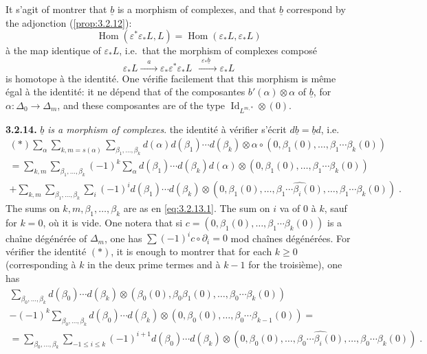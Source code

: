 \documentclass[12pt,a4paper]{article}
\theoremstyle{plain}
\theoremstyle{definition}
\DeclareMathOperator{\Hom}{Hom}
\DeclareMathOperator{\Id}{Id}
\providecommand{\Hom}{\operatorname{Hom}}
\begin{document}
It s'agit of montrer that $\underline{b}$ is a morphism of complexes, and that $\underline{b}$ correspond by the adjonction (\ref{prop:3.2.12}):
\[
\Hom(\varepsilon^{*}\varepsilon_{*}L, L) = \Hom(\varepsilon_{*}L, \varepsilon_{*}L)
\]
\`{a} the map identique of $\varepsilon_{*}L$, i.e.\ that the morphism of complexes compos\'{e}
\[
\varepsilon_{*}L \xrightarrow{\quad a\quad} \varepsilon_{*}\varepsilon^{*}\varepsilon_{*}L \xrightarrow{\quad \varepsilon_{*}\underline{b}\quad} \varepsilon_{*}L
\]
is homotope \`{a} the identit\'{e}. One v\'{e}rifie facilement that this morphism is m\^{e}me \'{e}gal \`{a} the identit\'{e}: it ne d\'{e}pend that of the composantes $b'(\alpha) \otimes \alpha$ of $\underline{b}$, for $\alpha: \Delta_{0} \to \Delta_{m}$, and these composantes are of the type $\Id_{L^{m,*}} \otimes (0)$.

\noindent\textbf{3.2.14.} $\underline{b}$ \emph{is a morphism of complexes}. the identit\'{e} \`{a} v\'{e}rifier s'\'{e}crit $d\underline{b} = \underline{b}d$, i.e.
\begin{multline*}
(*) \sum_{\alpha} \sum_{k,m=s(\alpha)} \sum_{\beta_{1},\ldots,\beta_{k}} d(\alpha)d(\beta_{1})\cdots d(\beta_{k}) \otimes \alpha \circ (0,\beta_{1}(0),\ldots,\beta_{1}\cdots\beta_{k}(0)) \\
= \sum_{k,m} \sum_{\beta_{1},\ldots,\beta_{k}} (-1)^{k} \sum_{\alpha} d(\beta_{1})\cdots d(\beta_{k})d(\alpha) \otimes (0,\beta_{1}(0),\ldots,\beta_{1}\cdots\beta_{k}(0)) \\
+ \sum_{k,m} \sum_{\beta_{1},\ldots,\beta_{k}} \sum_{i} (-1)^{i} d(\beta_{1})\cdots d(\beta_{k}) \otimes (0,\beta_{1}(0),\ldots,\widehat{\beta_{1}\cdots\beta_{i}(0)},\ldots,\beta_{1}\cdots\beta_{k}(0))\;.
\end{multline*}
The sums on $k,m,\beta_{1},\ldots,\beta_{k}$ are as en \eqref{eq:3.2.13.1}. The sum on $i$ va of $0$ \`{a} $k$, sauf for $k=0$, o\`{u} it is vide. One notera that si $c = (0,\beta_{1}(0),\ldots,\beta_{1}\cdots\beta_{k}(0))$ is a cha\^{i}ne d\'{e}g\'{e}n\'{e}r\'{e}e of $\Delta_{m}$, one has $\sum (-1)^{i} c \circ \partial_{i} = 0$ mod cha\^{i}nes d\'{e}g\'{e}n\'{e}r\'{e}es. For v\'{e}rifier the identit\'{e} $(*)$, it is enough to montrer that for each $k \geq 0$ (corresponding \`{a} $k$ in the deux prime termes and \`{a} $k-1$ for the troisi\`{e}me), one has
\begin{multline*}
\sum_{\beta_{0},\ldots,\beta_{k}} d(\beta_{0})\cdots d(\beta_{k}) \otimes (\beta_{0}(0), \beta_{0}\beta_{1}(0), \ldots, \beta_{0}\cdots\beta_{k}(0)) \\
- (-1)^{k} \sum_{\beta_{0},\ldots,\beta_{k}} d(\beta_{0})\cdots d(\beta_{k}) \otimes (0, \beta_{0}(0), \ldots, \beta_{0}\cdots\beta_{k-1}(0)) = \\
= \sum_{\beta_{0},\ldots,\beta_{k}} \sum_{-1 \leq i \leq k} (-1)^{i+1} d(\beta_{0})\cdots d(\beta_{k}) \otimes (0, \beta_{0}(0), \ldots, \widehat{\beta_{0}\cdots\beta_{i}(0)}, \ldots, \beta_{0}\cdots\beta_{k}(0))\;.
\end{multline*}
\end{document}
